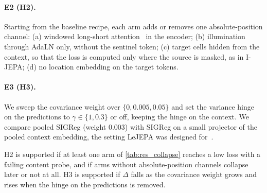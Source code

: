 \paragraph{E2 (H2).} Starting from the baseline recipe, each arm adds or removes one absolute-position channel: (a) windowed long-short attention~\cite{zhu2021long} in the encoder; (b) illumination through AdaLN only, without the sentinel token; (c) target cells hidden from the context, so that the loss is computed only where the source is masked, as in I-JEPA; (d) no location embedding on the target tokens.

\paragraph{E3 (H3).} We sweep the covariance weight over $\{0, 0.005, 0.05\}$ and set the variance hinge on the predictions to $\gamma \in \{1, 0.3\}$ or off, keeping the hinge on the context. We compare pooled SIGReg (weight 0.003) with SIGReg on a small projector of the pooled context embedding, the setting LeJEPA was designed for~\cite{balestriero2025lejepa}.

H2 is supported if at least one arm of \cref{tab:res_collapse} reaches a low loss with a failing content probe, and if arms without absolute-position channels collapse later or not at all. H3 is supported if $\Delta$ falls as the covariance weight grows and rises when the hinge on the predictions is removed. 

